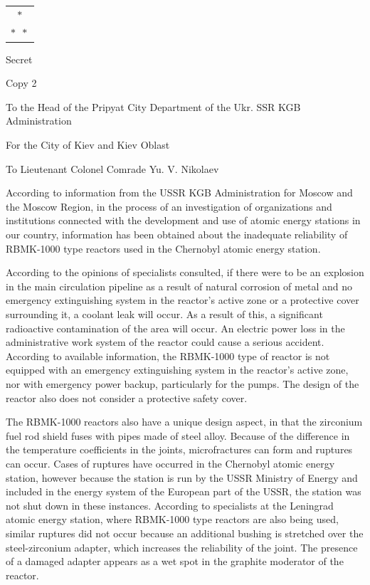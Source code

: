 \documentclass[openright]{bookest}
\newcommand{\varthreestars}{\begin{center}\begin{tabular}{c}$\ast$\\[-0.8ex] $\ast\enspace \ast $\end{tabular}\end{center}}
\begin{document}
\varthreestars

\begin{flushright}\small{
Secret

Copy 2

To the Head of the Pripyat City Department of the Ukr. SSR KGB Administration

For the City of Kiev and Kiev Oblast

To Lieutenant Colonel Comrade Yu. V. Nikolaev
}\end{flushright}

According to information from the USSR KGB Administration for Moscow and the Moscow Region, in the process of an investigation of organizations and institutions connected with the development and use of atomic energy stations in our country, information has been obtained about the inadequate reliability of RBMK-1000 type reactors used in the Chernobyl atomic energy station.

According to the opinions of specialists consulted, if there were to be an explosion in the main circulation pipeline as a result of natural corrosion of metal and no emergency extinguishing system in the reactor's active zone or a protective cover surrounding it, a coolant leak will occur. As a result of this, a significant radioactive contamination of the area will occur. An electric power loss in the administrative work system of the reactor could cause a serious accident. According to available information, the RBMK-1000 type of reactor is not equipped with an emergency extinguishing system in the reactor's active zone, nor with emergency power backup, particularly for the pumps. The design of the reactor also does not consider a protective safety cover.

The RBMK-1000 reactors also have a unique design aspect, in that the zirconium fuel rod shield fuses with pipes made of steel alloy. Because of the difference in the temperature coefficients in the joints, microfractures can form and ruptures can occur. Cases of ruptures have occurred in the Chernobyl atomic energy station, however because the station is run by the USSR Ministry of Energy and included in the energy system of the European part of the USSR, the station was not shut down in these instances. According to specialists at the Leningrad atomic energy station, where RBMK-1000 type reactors are also being used, similar ruptures did not occur because an additional bushing is stretched over the steel-zirconium adapter, which increases the reliability of the joint. The presence of a damaged adapter appears as a wet spot in the graphite moderator of the reactor.
\end{document}
